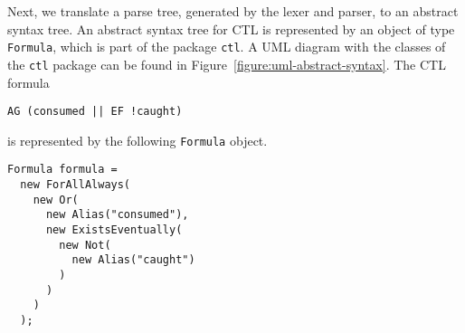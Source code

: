 \documentclass[12pt]{article}
\theoremstyle{definition}
\begin{document}
Next, we translate a parse tree, generated by the lexer and parser, to an abstract syntax tree.  An abstract syntax tree for CTL is represented by an object of type \lstinline{Formula}, which is part of the package \lstinline{ctl}.  A UML diagram with the classes of the \lstinline{ctl} package can be found in Figure~\ref{figure:uml-abstract-syntax}.  The CTL formula
\begin{lstlisting}
AG (consumed || EF !caught)
\end{lstlisting}
is represented by the following \lstinline{Formula} object.
\begin{lstlisting}
Formula formula =
  new ForAllAlways(
    new Or(
      new Alias("consumed"),
      new ExistsEventually(
        new Not(
          new Alias("caught")
        )
      )
    )
  );
\end{lstlisting}
\end{document}
